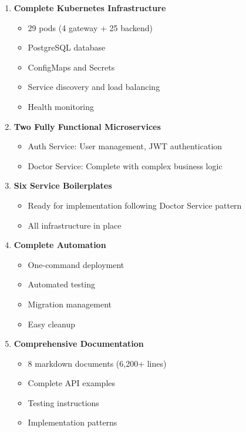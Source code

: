 \documentclass[12pt,a4paper]{article}
\begin{document}
\begin{enumerate}
    \item \textbf{Complete Kubernetes Infrastructure}
    \begin{itemize}
        \item 29 pods (4 gateway + 25 backend)
        \item PostgreSQL database
        \item ConfigMaps and Secrets
        \item Service discovery and load balancing
        \item Health monitoring
    \end{itemize}

    \item \textbf{Two Fully Functional Microservices}
    \begin{itemize}
        \item Auth Service: User management, JWT authentication
        \item Doctor Service: Complete with complex business logic
    \end{itemize}

    \item \textbf{Six Service Boilerplates}
    \begin{itemize}
        \item Ready for implementation following Doctor Service pattern
        \item All infrastructure in place
    \end{itemize}

    \item \textbf{Complete Automation}
    \begin{itemize}
        \item One-command deployment
        \item Automated testing
        \item Migration management
        \item Easy cleanup
    \end{itemize}

    \item \textbf{Comprehensive Documentation}
    \begin{itemize}
        \item 8 markdown documents (6,200+ lines)
        \item Complete API examples
        \item Testing instructions
        \item Implementation patterns
    \end{itemize}
\end{enumerate}
\end{document}
